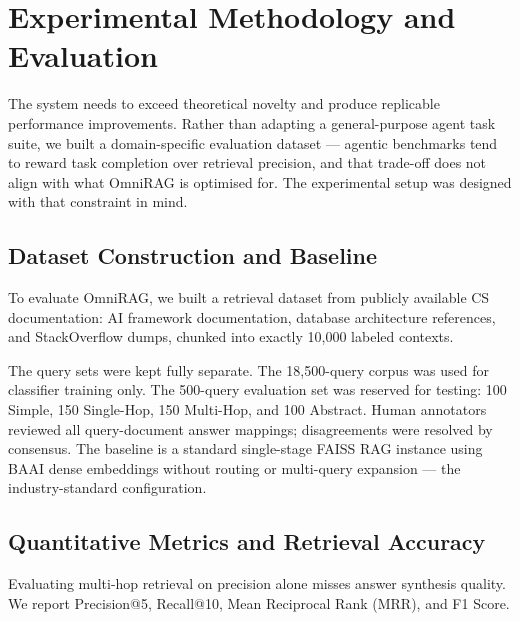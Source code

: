 \documentclass[conference]{IEEEtran}
\begin{document}
\section{Experimental Methodology and Evaluation}
\label{sec:eval}

The system needs to exceed theoretical novelty and produce replicable performance improvements. Rather than adapting a general-purpose agent task suite, we built a domain-specific evaluation dataset --- agentic benchmarks tend to reward task completion over retrieval precision, and that trade-off does not align with what OmniRAG is optimised for. The experimental setup was designed with that constraint in mind.

\subsection{Dataset Construction and Baseline}

To evaluate OmniRAG, we built a retrieval dataset from publicly available CS documentation: AI framework documentation, database architecture references, and StackOverflow dumps, chunked into exactly 10,000 labeled contexts.

The query sets were kept fully separate. The 18,500-query corpus was used for classifier training only. The 500-query evaluation set was reserved for testing: 100 Simple, 150 Single-Hop, 150 Multi-Hop, and 100 Abstract. Human annotators reviewed all query-document answer mappings; disagreements were resolved by consensus. The baseline is a standard single-stage FAISS RAG instance using BAAI dense embeddings without routing or multi-query expansion --- the industry-standard configuration.

\subsection{Quantitative Metrics and Retrieval Accuracy}

Evaluating multi-hop retrieval on precision alone misses answer synthesis quality. We report Precision@5, Recall@10, Mean Reciprocal Rank (MRR), and F1 Score.
\end{document}
